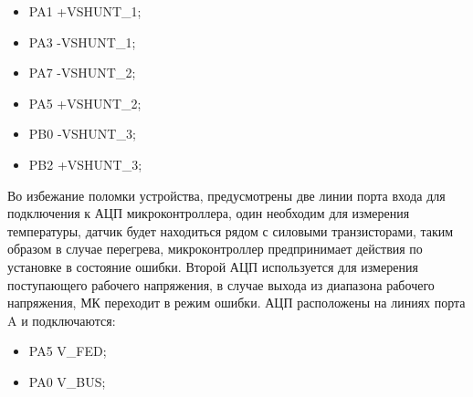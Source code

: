 \begin{itemize}
	\item PA1 \leftarrow +VSHUNT\_1;
	\item PA3 \leftarrow -VSHUNT\_1;
	\item PA7 \leftarrow -VSHUNT\_2;
	\item PA5 \leftarrow +VSHUNT\_2;  %
	\item PB0 \leftarrow -VSHUNT\_3;
	\item PB2 \leftarrow +VSHUNT\_3;  %
\end{itemize}


Во избежание поломки устройства, предусмотрены две линии порта входа для подключения к АЦП микроконтроллера, один необходим для измерения температуры, датчик будет находиться рядом с силовыми транзисторами, таким образом в случае перегрева, микроконтроллер предпринимает действия по установке в состояние ошибки. Второй АЦП используется для измерения поступающего рабочего напряжения, в случае выхода из диапазона рабочего напряжения, МК переходит в режим ошибки. АЦП расположены на линиях порта A и подключаются:

\begin{itemize}
	\item PA5 \rightarrow V\_FED;
	\item PA0 \rightarrow V\_BUS;
\end{itemize}


